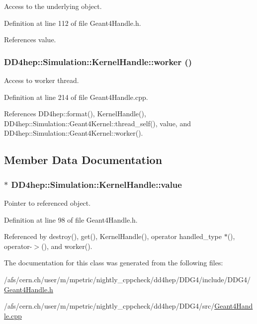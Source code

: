 Access to the underlying object. 

Definition at line 112 of file Geant4Handle.h.

References value.\hypertarget{class_d_d4hep_1_1_simulation_1_1_kernel_handle_a456dfc14c139dfc0e7dc06e0d891fd15}{
\subsubsection[{worker}]{ DD4hep::Simulation::KernelHandle::worker ()}}
\label{class_d_d4hep_1_1_simulation_1_1_kernel_handle_a456dfc14c139dfc0e7dc06e0d891fd15}


Access to worker thread. 

Definition at line 214 of file Geant4Handle.cpp.

References DD4hep::format(), KernelHandle(), DD4hep::Simulation::Geant4Kernel::thread\_\-self(), value, and DD4hep::Simulation::Geant4Kernel::worker().

\subsection{Member Data Documentation}
\hypertarget{class_d_d4hep_1_1_simulation_1_1_kernel_handle_a1d57797e5b730bb29365c2cd92911582}{
\subsubsection[{value}]{$\ast$ {\bf DD4hep::Simulation::KernelHandle::value}}}
\label{class_d_d4hep_1_1_simulation_1_1_kernel_handle_a1d57797e5b730bb29365c2cd92911582}


Pointer to referenced object. 

Definition at line 98 of file Geant4Handle.h.

Referenced by destroy(), get(), KernelHandle(), operator handled\_\-type $\ast$(), operator-\/$>$(), and worker().

The documentation for this class was generated from the following files:\begin{DoxyCompactItemize}
\item 
/afs/cern.ch/user/m/mpetric/nightly\_\-cppcheck/dd4hep/DDG4/include/DDG4/\hyperlink{_geant4_handle_8h}{Geant4Handle.h}\item 
/afs/cern.ch/user/m/mpetric/nightly\_\-cppcheck/dd4hep/DDG4/src/\hyperlink{_geant4_handle_8cpp}{Geant4Handle.cpp}\end{DoxyCompactItemize}
